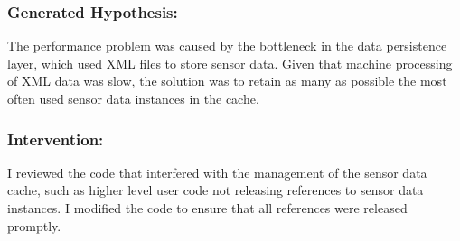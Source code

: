 \subsubsection{Generated Hypothesis:}

The performance problem was caused by the bottleneck in the data persistence layer, which used XML files to store sensor data. Given that machine processing of XML data was slow, the solution was to retain as many as possible the most often used sensor data instances in the cache.

\subsubsection{Intervention:}

I reviewed the code that interfered with the management of the sensor data cache, such as higher level user code not releasing references to sensor data instances. I modified the code to ensure that all references were released promptly.

